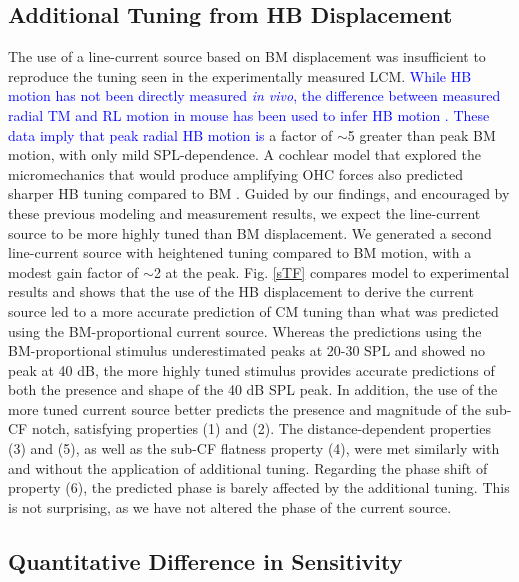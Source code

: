 \documentclass{biophys-new}
\begin{document}
\subsection{Additional Tuning from HB Displacement}
\par{The use of a line-current source based on BM displacement was insufficient to reproduce the tuning seen in the experimentally measured LCM. \textcolor{blue}{While HB motion has not been directly measured \textit{in vivo}, the difference between measured radial TM and RL motion in mouse has been used to infer HB motion \cite{lee}. These data imply that peak radial HB motion is} a factor of $\sim$5 greater than peak BM motion, with only mild SPL-dependence. A cochlear model that explored the micromechanics that would produce amplifying OHC forces also predicted sharper HB tuning compared to BM  \cite{nankaliwang}. Guided by our findings, and encouraged by these previous modeling and measurement results, we expect the line-current source to be more highly tuned than BM displacement.  We generated a second line-current source with heightened tuning compared to BM motion, with a modest gain factor of $\sim$2 at the peak. Fig. \ref{sTF} compares model to experimental results and shows that the use of the HB displacement to derive the current source led to a more accurate prediction of CM tuning than what was predicted using the BM-proportional current source. Whereas the predictions using the BM-proportional stimulus underestimated peaks at 20-30 SPL and showed no peak at 40 dB, the more highly tuned stimulus provides accurate predictions of both the presence and shape of the 40 dB SPL peak.  In addition, the use of the more tuned current source better predicts the presence and magnitude of the sub-CF notch, satisfying properties (1) and (2). The distance-dependent properties (3) and (5), as well as the sub-CF flatness property (4), were met similarly  with and without the application of additional tuning.  Regarding the phase shift of property (6), the predicted phase is barely affected by the additional tuning.  This is not surprising, as we have not altered the phase of the current source.}

\subsection{Quantitative Difference in Sensitivity}
\end{document}
